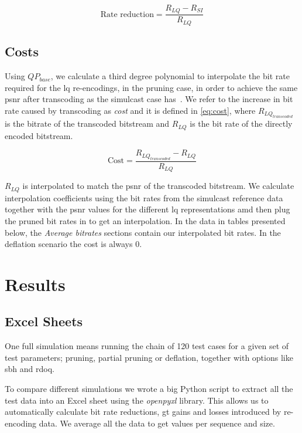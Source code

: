 \begin{equation}
\label{eq:rate-reduction}
\text{Rate reduction} = \frac{R_{LQ} - R_{SI}}{R_{LQ}}
\end{equation}

\subsection{Costs}
\label{subsec:costs}
Using $QP_{base}$, we calculate a third degree polynomial to interpolate the bit rate required for the \gls{lq} re-encodings, in the pruning case, in order to achieve the same \gls{psnr} after transcoding as the simulcast case has~\cite{Bjontegaard}. We refer to the increase in bit rate caused by transcoding as \textit{cost} and it is defined in \cref{eq:cost}, where $R_{LQ_{transcoded}}$ is the bitrate of the transcoded bitstream and $R_{LQ}$ is the bit rate of the directly encoded bitstream.

\begin{equation}
\label{eq:cost}
\text{Cost} = \frac{R_{LQ_{transcoded}} - R_{LQ}}{R_{LQ}}
\end{equation}

$R_{LQ}$ is interpolated to match the \gls{psnr} of the transcoded bitstream. We calculate interpolation coefficients using the bit rates from the simulcast reference data together with the \gls{psnr} values for the different \gls{lq} representations amd then plug the pruned bit rates in to get an interpolation. In the data in tables presented below, the \textit{Average bitrates} sections contain our interpolated bit rates. In the deflation scenario the cost is always 0.


\section{Results}
\subsection{Excel Sheets}
One full simulation means running the chain of 120 test cases for a given set of test parameters; pruning, partial pruning or deflation, together with options like \gls{sbh} and \gls{rdoq}.

To compare different simulations we wrote a big Python script to extract all the test data into an Excel sheet using the \textit{openpyxl} library. This allows us to automatically calculate bit rate reductions, \gls{gt} gains and losses introduced by re-encoding data. We average all the data to get values per sequence and size.


